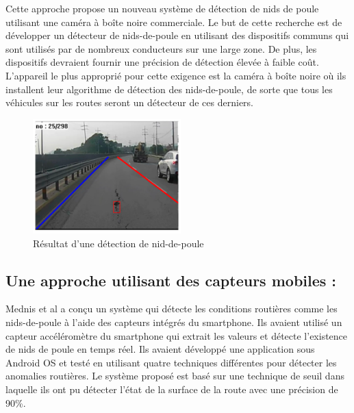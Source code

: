     Cette approche \cite{joPotholeDetectionSystem2015} propose un nouveau système de détection de nids de poule utilisant une caméra à boîte noire commerciale. Le but de cette recherche est de développer un détecteur de nids-de-poule en utilisant des dispositifs communs qui sont utilisés par de nombreux conducteurs sur une large zone. De plus, les dispositifs devraient fournir une précision de détection élevée à faible coût. L'appareil le plus approprié pour cette exigence est la caméra à boîte noire où ils installent leur algorithme de détection des nids-de-poule, de sorte que tous les véhicules sur les routes seront un détecteur de ces derniers.
    \begin{figure}[h!]
      \center
      \includegraphics[width=0.51\textwidth]{Images/chapter1/resultatDePotholDetection.jpg}
      \caption{Résultat d'une détection de nid-de-poule}
      \end{figure}

\subsection{Une approche utilisant des capteurs mobiles :}
  Mednis et al\cite{tilluMobileSensorsComponents2019} a conçu un système qui détecte les conditions routières comme les nids-de-poule à l'aide des capteurs intégrés du smartphone. Ils avaient utilisé un capteur accéléromètre du smartphone qui extrait les valeurs et détecte l'existence de nids de poule en temps réel. Ils avaient développé une application sous Android OS et testé en utilisant quatre techniques différentes pour détecter les anomalies routières.
Le système proposé est basé sur une technique de seuil dans laquelle ils ont pu détecter l'état de la surface de la route avec une précision de 90\%.



